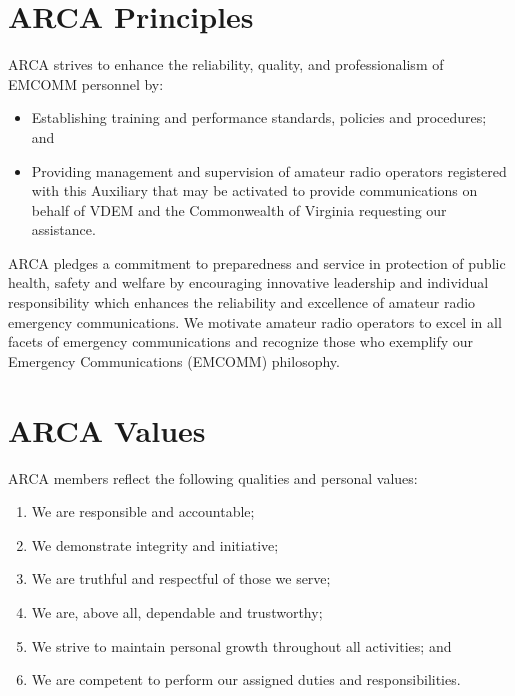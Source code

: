 \documentclass[pdflatex,letterpaper,twoside,12pt]{book}
\begin{document}

\section{ARCA Principles}

ARCA strives to enhance the reliability, quality, and professionalism of EMCOMM personnel by:

\begin{itemize}
	\item Establishing training and performance standards, policies and procedures; and
	\item Providing management and supervision of amateur radio operators registered with this Auxiliary that may be activated to provide communications on behalf of VDEM and the Commonwealth of Virginia requesting our assistance.
\end{itemize}

ARCA pledges a commitment to preparedness and service in protection of public health, safety and welfare by encouraging innovative leadership and individual responsibility which enhances the reliability and excellence of amateur radio emergency communications. We motivate amateur radio operators to excel in all facets of emergency communications and recognize those who exemplify our Emergency Communications (EMCOMM) philosophy.


\section{ARCA Values}

ARCA members reflect the following qualities and personal values:

\begin{enumerate}
	\item We are responsible and accountable;
	\item We demonstrate integrity and initiative;
	\item We are truthful and respectful of those we serve;
	\item We are, above all, dependable and trustworthy;
	\item We strive to maintain personal growth throughout all activities; and
	\item We are competent to perform our assigned duties and responsibilities.
\end{enumerate}
\end{document}
